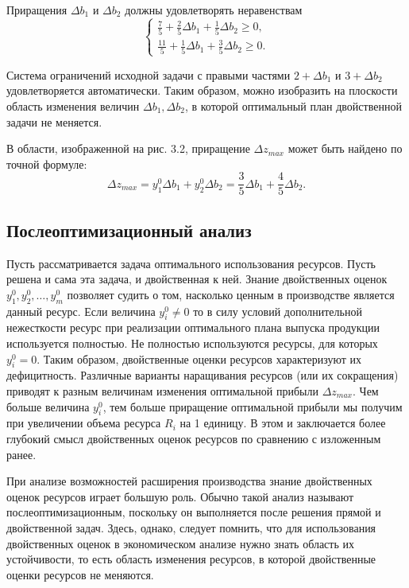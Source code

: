 {Приращения $\Delta b_1$ и $\Delta b_2$ должны удовлетворять неравенствам
\[
\begin{cases}
\frac{7}{5} + \frac{2}{5} \Delta b_1 + \frac{1}{5} \Delta b_2 \ge 0, \\
\frac{11}{5} + \frac{1}{5} \Delta b_1 + \frac{3}{5} \Delta b_2 \ge 0.
\end{cases}
\]

Система ограничений исходной задачи с правыми частями $2 + \Delta b_1$ и $3 + \Delta b_2$ удовлетворяется автоматически. Таким образом,  можно изобразить на плоскости  область  изменения величин $\Delta b_1, \Delta b_2$,  в которой оптимальный план двойственной задачи не меняется.

В области, изображенной на рис. 3.2, приращение $\Delta z_{max}$ может быть найдено по точной формуле:
\[
\Delta z_{max} = y^0_1 \Delta b_1 + y^0_2 \Delta b_2 = \frac{3}{5} \Delta b_1 + \frac{4}{5} \Delta b_2.
\]
}

\subsection{Послеоптимизационный анализ}

Пусть рассматривается задача оптимального использования ресурсов. Пусть решена и сама эта задача, и двойственная к ней. Знание двойственных оценок $y^0_1, y^0_2, \ldots, y^0_m$ позволяет судить о том, насколько ценным в производстве является данный ресурс. Если величина $y^0_i \neq 0$ то в силу условий дополнительной нежесткости ресурс при реализации оптимального плана выпуска продукции используется полностью. Не полностью используются ресурсы, для которых $y^0_i = 0$. Таким образом, двойственные оценки ресурсов характеризуют их дефицитность. Различные варианты наращивания ресурсов (или их сокращения) приводят к разным величинам изменения оптимальной прибыли $\Delta z_{max}$. Чем больше величина $y^0_i$, тем больше приращение оптимальной прибыли мы получим при увеличении объема ресурса $R_i$ на 1 единицу. В этом и заключается более глубокий смысл двойственных оценок ресурсов по сравнению с изложенным ранее.

При анализе возможностей  расширения производства знание двойственных оценок ресурсов играет большую роль. Обычно такой анализ называют послеоптимизационным, поскольку он выполняется после  решения прямой и двойственной задач. Здесь, однако, следует помнить, что для использования двойственных оценок в экономическом анализе нужно знать область их устойчивости, то есть область изменения ресурсов, в которой двойственные оценки ресурсов не меняются.

